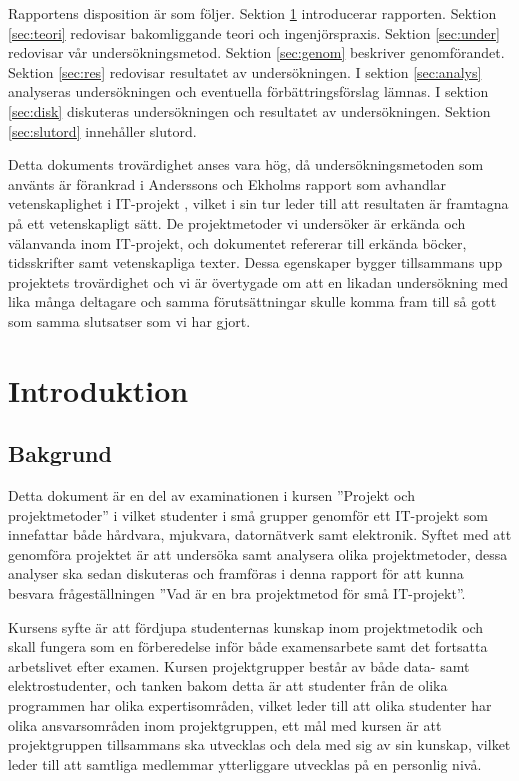 \documentclass[conference,a4paper]{IEEEtran}
\begin{document}
Rapportens disposition är som följer. Sektion \ref{sec:intro} introducerar rapporten. Sektion \ref{sec:teori} redovisar bakomliggande teori och ingenjörspraxis. Sektion \ref{sec:under} redovisar vår undersökningsmetod. Sektion \ref{sec:genom} beskriver genomförandet. Sektion \ref{sec:res} redovisar resultatet av undersökningen. I sektion \ref{sec:analys} analyseras undersökningen och eventuella förbättringsförslag lämnas. I sektion \ref{sec:disk} diskuteras undersökningen och resultatet av undersökningen. Sektion \ref{sec:slutord} innehåller slutord.

Detta dokuments trovärdighet anses vara hög, då undersökningsmetoden som använts är förankrad i Anderssons och Ekholms rapport som avhandlar vetenskaplighet i IT-projekt \cite{Andersson02}, vilket i sin tur leder till att resultaten är framtagna på ett vetenskapligt sätt. De projektmetoder vi undersöker är erkända och välanvanda inom IT-projekt, och dokumentet refererar till erkända böcker, tidsskrifter samt vetenskapliga texter. Dessa egenskaper bygger tillsammans upp projektets trovärdighet och vi är övertygade om att en likadan undersökning med lika många deltagare och samma förutsättningar skulle komma fram till så gott som samma slutsatser som vi har gjort.

\section{Introduktion} \label{sec:intro}

\subsection{Bakgrund}
Detta dokument är en del av examinationen i kursen ''Projekt och projektmetoder'' i vilket studenter i små grupper genomför ett IT-projekt som innefattar både hårdvara, mjukvara, datornätverk samt elektronik. Syftet med att genomföra projektet är att undersöka samt analysera olika projektmetoder, dessa analyser ska sedan diskuteras och framföras i denna rapport för att kunna besvara frågeställningen ''Vad är en bra projektmetod för små IT-projekt''.

Kursens syfte är att fördjupa studenternas kunskap inom projektmetodik och skall fungera som en förberedelse inför både examensarbete samt det fortsatta arbetslivet efter examen. Kursen projektgrupper består av både data- samt elektrostudenter, och tanken bakom detta är att studenter från de olika programmen har olika expertisområden, vilket leder till att olika studenter har olika ansvarsområden inom projektgruppen, ett mål med kursen är att projektgruppen tillsammans ska utvecklas och dela med sig av sin kunskap, vilket leder till att samtliga medlemmar ytterliggare utvecklas på en personlig nivå.
\end{document}
